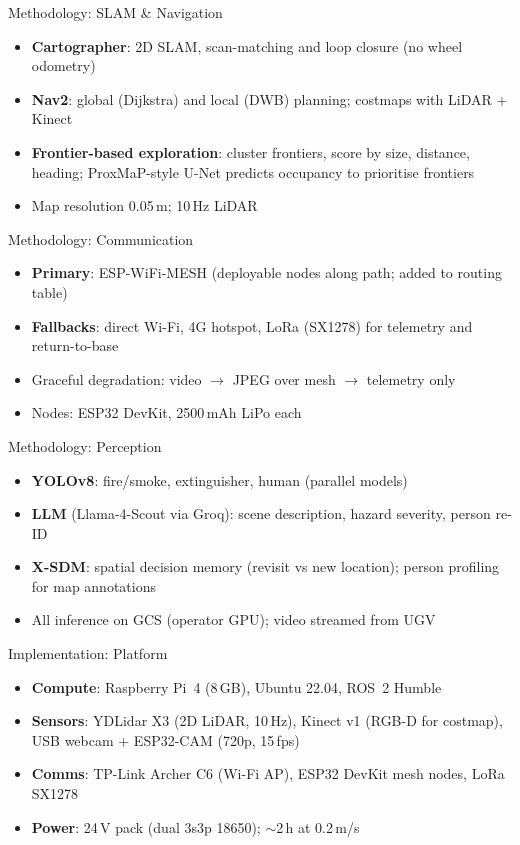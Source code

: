 \documentclass[aspectratio=169]{beamer}
\begin{document}
\begin{frame}{Methodology: SLAM \& Navigation}
\begin{itemize}
\item \textbf{Cartographer}: 2D SLAM, scan-matching and loop closure (no wheel odometry)
\item \textbf{Nav2}: global (Dijkstra) and local (DWB) planning; costmaps with LiDAR + Kinect
\item \textbf{Frontier-based exploration}: cluster frontiers, score by size, distance, heading; ProxMaP-style U-Net predicts occupancy to prioritise frontiers
\item Map resolution 0.05\,m; 10\,Hz LiDAR
\end{itemize}
\end{frame}

\begin{frame}{Methodology: Communication}
\begin{itemize}
\item \textbf{Primary}: ESP-WiFi-MESH (deployable nodes along path; added to routing table)
\item \textbf{Fallbacks}: direct Wi-Fi, 4G hotspot, LoRa (SX1278) for telemetry and return-to-base
\item Graceful degradation: video $\rightarrow$ JPEG over mesh $\rightarrow$ telemetry only
\item Nodes: ESP32 DevKit, 2500\,mAh LiPo each
\end{itemize}
\end{frame}

\begin{frame}{Methodology: Perception}
\begin{itemize}
\item \textbf{YOLOv8}: fire/smoke, extinguisher, human (parallel models)
\item \textbf{LLM} (Llama-4-Scout via Groq): scene description, hazard severity, person re-ID
\item \textbf{X-SDM}: spatial decision memory (revisit vs new location); person profiling for map annotations
\item All inference on GCS (operator GPU); video streamed from UGV
\end{itemize}
\end{frame}

\begin{frame}{Implementation: Platform}
\begin{itemize}
\item \textbf{Compute}: Raspberry Pi~4 (8\,GB), Ubuntu 22.04, ROS~2 Humble
\item \textbf{Sensors}: YDLidar X3 (2D LiDAR, 10\,Hz), Kinect v1 (RGB-D for costmap), USB webcam + ESP32-CAM (720p, 15\,fps)
\item \textbf{Comms}: TP-Link Archer C6 (Wi-Fi AP), ESP32 DevKit mesh nodes, LoRa SX1278
\item \textbf{Power}: 24\,V pack (dual 3s3p 18650); $\sim$2\,h at 0.2\,m/s
\end{itemize}
\end{frame}
\end{document}
